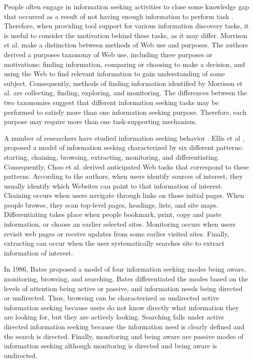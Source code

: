 \documentclass{casconpaper}
\begin{document}
{People often engage in information seeking activities to close some knowledge gap that occurred as a result of not having enough information to perform task \cite{proper}. Therefore, when providing tool support for various information discovery tasks, it is useful to consider the motivation behind these tasks, as it may differ. Morrison et al. \cite{morrison} make a distinction between methods of Web use and purposes. The authors derived a purposes taxonomy of Web use, including three purposes or motivations: finding information, comparing or choosing to make a decision, and using the Web to find relevant information to gain understanding of some subject. Consequently, methods of finding information identified by Morrison et al. are collecting, finding, exploring, and monitoring. The differences between the two taxonomies suggest that different information seeking tasks may be performed to satisfy more than one information seeking purpose. Therefore, each purpose may require more than one task-supporting mechanism. 

A number of researchers have studied information seeking behavior \cite{bates2002, bates1986, choo, ellis1989, ellis1997, ellis1993}. Ellis et al \cite{ellis1989, ellis1997, ellis1993}, proposed a model of information seeking characterized by six different patterns: starting, chaining, browsing, extracting, monitoring, and differentiating. Consequently, Choo et al. \cite{choo} derived anticipated Web tasks that correspond to these patterns. According to the authors, when users identify sources of interest, they usually identify which Websites can point to that information of interest.  Chaining occurs when users navigate through links on those initial pages. When people browse, they scan top-level pages, headings, lists, and site maps. Differentiating takes place when people bookmark, print, copy and paste information, or choose an earlier selected sites. Monitoring occurs when users revisit web pages or receive updates from some earlier visited sites. Finally, extracting can occur when the user systematically searches site to extract information of interest. 

In 1986, Bates \cite{bates1986} proposed a model of four information seeking modes being aware, monitoring, browsing, and searching. Bates differentiated the modes based on the levels of attention being active or passive, and information needs being directed or undirected. Thus, browsing can be characterized as undirected active information seeking because users do not know directly what information they are looking for, but they are actively looking. Searching falls under active directed information seeking because the information need is clearly defined and the search is directed. Finally, monitoring and being aware are passive modes of information seeking although monitoring is directed and being aware is undirected.   

}
\end{document}
